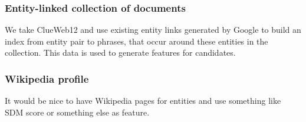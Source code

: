 \subsubsection{Entity-linked collection of documents}
We take ClueWeb12 and use existing entity links generated by Google to build an index from entity pair to phrases, that occur around these entities in the collection.
This data is used to generate features for candidates.

\subsubsection{Wikipedia profile}
It would be nice to have Wikipedia pages for entities and use something like SDM score or something else as feature.